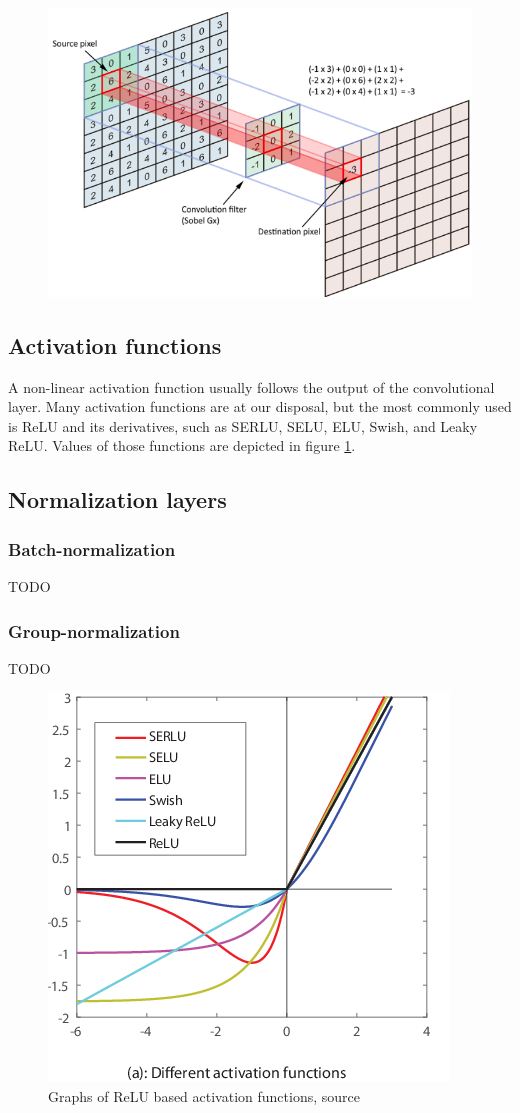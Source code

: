 \begin{figure}
    \centering
    \includegraphics[width=0.9\linewidth]{images/conv_img.png}
\end{figure}

\subsection{Activation functions}
A non-linear activation function usually follows the output of the convolutional layer. Many activation functions are at our disposal, but the most commonly used is ReLU and its derivatives, such as SERLU, SELU, ELU, Swish, and Leaky ReLU. Values of those functions are depicted in figure \ref{fig:activation_functions}.

\subsection{Normalization layers}
\subsubsection{Batch-normalization}
TODO
\subsubsection{Group-normalization}
TODO

\begin{figure}
    \centering
    \includegraphics[width=0.6\linewidth]{images/activation_functions.png}
    \caption{Graphs of ReLU based activation functions, source \cite{Zhang2018}}
    \label{fig:activation_functions}
\end{figure}



